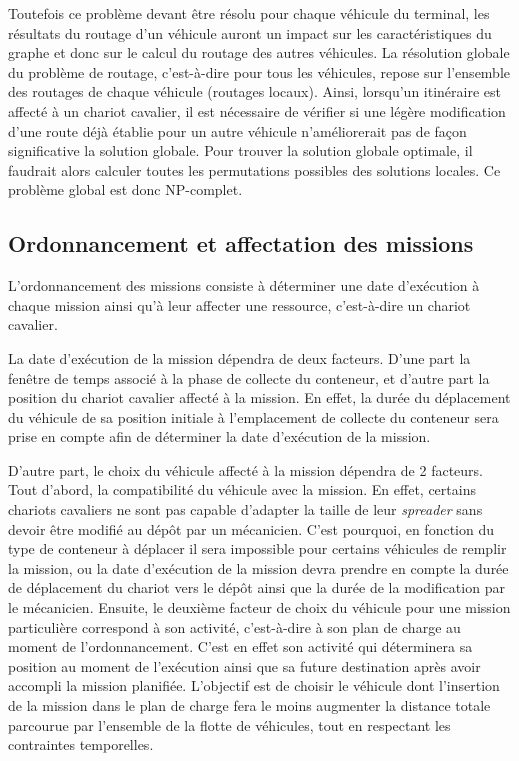 Toutefois ce problème devant être résolu pour chaque véhicule du terminal, les résultats du routage d'un véhicule auront un impact sur les caractéristiques du graphe et donc sur le calcul du routage des autres véhicules. 
La résolution globale du problème de routage, c'est-à-dire pour tous les véhicules, repose sur l'ensemble des routages de chaque véhicule (routages locaux). 
Ainsi, lorsqu'un itinéraire est affecté à un chariot cavalier, il est nécessaire de vérifier si une légère modification d'une route déjà établie pour un autre véhicule n'améliorerait pas de façon significative la solution globale. 
Pour trouver la solution globale optimale, il faudrait alors calculer toutes les permutations possibles des solutions locales. 
Ce problème global est donc NP-complet.

\subsection{Ordonnancement et affectation des missions}

L'ordonnancement des missions consiste à déterminer une date d'exécution à chaque mission ainsi qu'à leur affecter une ressource, c'est-à-dire un chariot cavalier. 


La date d'exécution de la mission dépendra de deux facteurs. D'une part la fenêtre de temps associé à la phase de collecte du conteneur, et d'autre part la position du chariot cavalier affecté à la mission. En effet, la durée du déplacement du véhicule de sa position initiale à l'emplacement de collecte du conteneur sera prise en compte afin de déterminer la date d'exécution de la mission.

D'autre part, le choix du véhicule affecté à la mission dépendra de 2 facteurs. 
Tout d'abord, la compatibilité du véhicule avec la mission. En effet, certains chariots cavaliers ne sont pas capable d'adapter la taille de leur \textit{spreader} sans devoir être modifié au dépôt par un mécanicien. C'est pourquoi, en fonction du type de conteneur à déplacer il sera impossible pour certains véhicules de remplir la mission, ou la date d'exécution de la mission devra prendre en compte la durée de déplacement du chariot vers le dépôt ainsi que la durée de la modification par le mécanicien.
Ensuite, le deuxième facteur de choix du véhicule pour une mission particulière correspond à son activité, c'est-à-dire à son plan de charge au moment de l'ordonnancement. C'est en effet son activité qui déterminera sa position au moment de l'exécution ainsi que sa future destination après avoir accompli la mission planifiée.
L'objectif est de choisir le véhicule dont l'insertion de la mission dans le plan de charge fera le moins augmenter la distance totale parcourue par l'ensemble de la flotte de véhicules, tout en respectant les contraintes temporelles.

